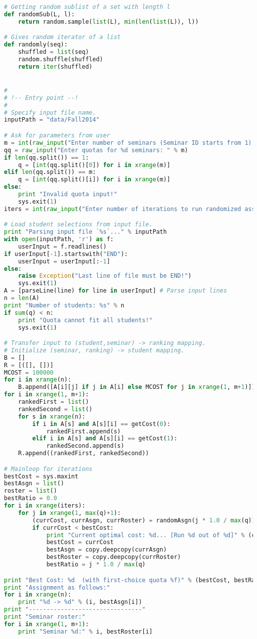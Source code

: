 \documentclass{article} %
\begin{document}
\begin{lstlisting}[language=python]
# Getting random sublist of a set with length l
def randomSub(L, l):
    return random.sample(list(L), min(len(list(L)), l))

# Gives random iterator of a list
def randomly(seq):
    shuffled = list(seq)
    random.shuffle(shuffled)
    return iter(shuffled)


#
# !-- Entry point --!
#
# Specify input file name. 
inputPath = "data/Fall2014"

# Ask for parameters from user
m = int(raw_input("Enter number of seminars (Seminar ID starts from 1): "))
qq = raw_input("Enter quotas for %d seminars: " % m)
if len(qq.split()) == 1:
    q = [int(qq.split()[0]) for i in xrange(m)]
elif len(qq.split()) == m:
    q = [int(qq.split()[i]) for i in xrange(m)]
else:
    print "Invalid quota input!"
    sys.exit(1)
iters = int(raw_input("Enter number of iterations to run randomized assignment: "))

# Load student selections from input file.
print "Parsing input file `%s`..." % inputPath
with open(inputPath, 'r') as f:
    userInput = f.readlines()
if userInput[-1].startswith("END"):
    userInput = userInput[:-1]
else:
    raise Exception("Last line of file must be END!")
    sys.exit(1)
A = [parseLine(line) for line in userInput] # Parse input lines
n = len(A)
print "Number of students: %s" % n
if sum(q) < n:
    print "Quota cannot fit all students!"
    sys.exit(1)

# Transfer input to (student,seminar) -> ranking mapping.
# Initialize (seminar, ranking) -> student mapping.
B = []
R = [([], [])]
MCOST = 100000
for i in xrange(n):
    B.append([A[i][j] if j in A[i] else MCOST for j in xrange(1, m+1)])
for i in xrange(1, m+1):
    rankedFirst = list()
    rankedSecond = list()
    for s in xrange(n):
        if i in A[s] and A[s][i] == getCost(0):
            rankedFirst.append(s)
        elif i in A[s] and A[s][i] == getCost(1):
            rankedSecond.append(s)
    R.append((rankedFirst, rankedSecond))

# Mainloop for iterations
bestCost = sys.maxint
bestAsgn = list()
roster = list()
bestRatio = 0.0
for i in xrange(iters):
    for j in xrange(1, max(q)+1):
        (currCost, currAsgn, currRoster) = randomAsgn(j * 1.0 / max(q))
        if currCost < bestCost:
            print "Current optimal cost: %d... [Run %d out of %d]" % (currCost, i+1, iters)
            bestCost = currCost
            bestAsgn = copy.deepcopy(currAsgn)
            bestRoster = copy.deepcopy(currRoster)
            bestRatio = j * 1.0 / max(q)

print "Best Cost: %d  (with first-choice quota %f)" % (bestCost, bestRatio)
print "Assignment as follows:"
for i in xrange(n):
    print "%d -> %d" % (i, bestAsgn[i])
print "--------------------------------"
print "Seminar roster:"
for i in xrange(1, m+1):
    print "Seminar %d:" % i, bestRoster[i]
\end{lstlisting}

\vspace{\fill}
\end{document}
